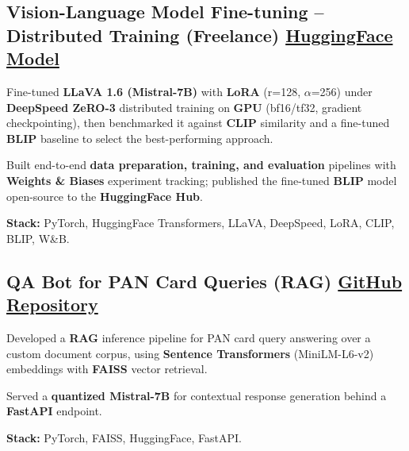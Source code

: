 \documentclass[letter,10pt]{article}
\begin{document}
\subsection{Vision-Language Model Fine-tuning – Distributed Training (Freelance) \hfill \href{https://huggingface.co/sunil448832/blip-model}{HuggingFace Model}}
\begin{zitemize}
\item Fine-tuned \textbf{LLaVA 1.6 (Mistral-7B)} with \textbf{LoRA} (r=128, $\alpha$=256) under \textbf{DeepSpeed ZeRO-3} distributed training on \textbf{GPU} (bf16/tf32, gradient checkpointing), then benchmarked it against \textbf{CLIP} similarity and a fine-tuned \textbf{BLIP} baseline to select the best-performing approach.
\item Built end-to-end \textbf{data preparation, training, and evaluation} pipelines with \textbf{Weights \& Biases} experiment tracking; published the fine-tuned \textbf{BLIP} model open-source to the \textbf{HuggingFace Hub}.
\item \textbf{Stack:} PyTorch, HuggingFace Transformers, LLaVA, DeepSpeed, LoRA, CLIP, BLIP, W\&B.
\end{zitemize}

\subsection{QA Bot for PAN Card Queries (RAG) \hfill \href{https://github.com/sunil448832/Natural-Language-Processing/tree/master/RAG(Retrieval\%20Augment\%20Generation)}{GitHub Repository}}
\begin{zitemize}
\item Developed a \textbf{RAG} inference pipeline for PAN card query answering over a custom document corpus, using \textbf{Sentence Transformers} (MiniLM-L6-v2) embeddings with \textbf{FAISS} vector retrieval.
\item Served a \textbf{quantized Mistral-7B} for contextual response generation behind a \textbf{FastAPI} endpoint.
\item \textbf{Stack:} PyTorch, FAISS, HuggingFace, FastAPI.
\end{zitemize}
\end{document}
